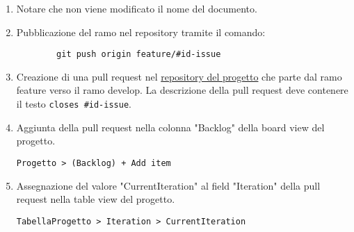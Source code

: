 \documentclass[a4paper, 12pt]{article}
\begin{document}
\begin{enumerate}
    \item Notare che non viene modificato il nome del documento.
    
    \item Pubblicazione del ramo nel repository tramite il comando:
    \begin{lstlisting}
        git push origin feature/#id-issue
    \end{lstlisting}

    \item Creazione di una pull request nel \href{https://github.com/ALT-F4-eng/SorgentiDocumentazione}{repository del progetto} che parte dal ramo feature verso il ramo develop.
    La descrizione della pull request deve contenere il testo \lstinline|closes #id-issue|.

    \item Aggiunta della pull request nella colonna "Backlog" della board view del progetto.
        
    \lstinline|Progetto > (Backlog) + Add item|
    
    \item Assegnazione del valore "CurrentIteration" al field "Iteration" della pull request nella table view del progetto.
    
    \lstinline|TabellaProgetto > Iteration > CurrentIteration|

\end{enumerate}
\end{document}
